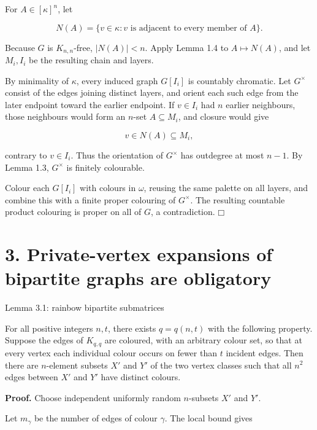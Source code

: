 \documentclass[11pt]{article}
\providecommand{\square}{\mdlgwhtsquare}
\begin{document}
For \(A\in[\kappa]^n\), let

\[
N(A)=\{v\in\kappa:v\text{ is adjacent to every member of }A\}.
\]

Because \(G\) is \(K_{n,n}\)-free, \(|N(A)|<n\). Apply Lemma 1.4 to \(A\mapsto N(A)\), and let \(M_i,I_i\) be the resulting chain and layers.

By minimality of \(\kappa\), every induced graph \(G[I_i]\) is countably chromatic. Let \(G^\times\) consist of the edges joining distinct layers, and orient each such edge from the later endpoint toward the earlier endpoint. If \(v\in I_i\) had \(n\) earlier neighbours, those neighbours would form an \(n\)-set \(A\subseteq M_i\), and closure would give

\[
v\in N(A)\subseteq M_i,
\]

contrary to \(v\in I_i\). Thus the orientation of \(G^\times\) has outdegree at most \(n-1\). By Lemma 1.3, \(G^\times\) is finitely colourable.

Colour each \(G[I_i]\) with colours in \(\omega\), reusing the same palette on all layers, and combine this with a finite proper colouring of \(G^\times\). The resulting countable product colouring is proper on all of \(G\), a contradiction. \(\square\)

\section{3. Private-vertex expansions of bipartite graphs are obligatory}\label{private-vertex-expansions-of-bipartite-graphs-are-obligatory}

\label{lemma-3.1-rainbow-bipartite-submatrices}
\begin{lemmabox}{Lemma 3.1: rainbow bipartite submatrices}

For all positive integers \(n,t\), there exists \(q=q(n,t)\) with the following property. Suppose the edges of \(K_{q,q}\) are coloured, with an arbitrary colour set, so that at every vertex each individual colour occurs on fewer than \(t\) incident edges. Then there are \(n\)-element subsets \(X'\) and \(Y'\) of the two vertex classes such that all \(n^2\) edges between \(X'\) and \(Y'\) have distinct colours.

\end{lemmabox}
\textbf{Proof.} Choose independent uniformly random \(n\)-subsets \(X'\) and \(Y'\).

Let \(m_\gamma\) be the number of edges of colour \(\gamma\). The local bound gives
\end{document}
